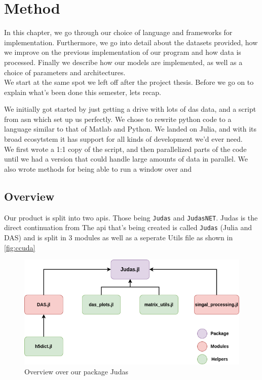 \chapter{Method}
\label{chap:method}

In this chapter, we go through our choice of language and frameworks for implementation. Furthermore, we go into detail about the datasets provided, how we improve on the previous implementation of our program and how data is processed. Finally we describe how our models are implemented, as well as a choice of parameters and architectures. \\



We start at the same spot we left off after the project thesis. Before we go on to explain what's been done this semester, lets recap. 

We initially got started by just getting a drive with lots of \acrshort{das} data, and a script from \acrfull{asn} which set up us perfectly. We chose to rewrite python code to a language similar to that of Matlab and Python. We landed on Julia, and with its broad ecosytstem it has support for all kinds of development we'd ever need. \\

We first wrote a 1:1 copy of the script, and then parallelized parts of the code until we had a version that could handle large amounts of data in parallel. We also wrote methods for being able to run a window over and \\ 


\section{Overview}

Our product is split into two apis. Those being \texttt{Judas} and \texttt{JudasNET}. Judas is the direct continuation from \cite{projthesis}
The \acrshort{api} that's being created is called \texttt{Judas} (Julia and DAS) and is split in 3 modules as well as a seperate Utils file as shown in \ref{fig:ccuda}

\begin{figure}[h]
    \centering
    \includegraphics[scale=.6]{figures/judas_overview.png}
    \caption{Overview over our package Judas}
    \label{fig:judasoverview}
\end{figure}

